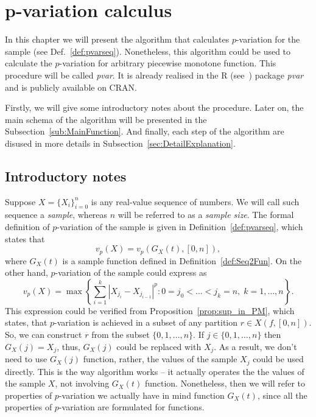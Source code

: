 \documentclass[12pt, a4paper]{article}
\numberwithin{equation}{section}
\begin{document}
\section{p-variation calculus}  
\label{sec:pvarcalc}  
  
In this chapter we will present the algorithm that calculates 
$p$-variation for the sample (see Def.~\ref{def:pvarseq}). 
Nonetheless, this algorithm could be used to calculate
the $p$-variation for arbitrary piecewise monotone function. 
This procedure will be called \emph{pvar}. 
It is already realised in the R (see~\cite{R}) package \emph{pvar} and
is publicly available on CRAN\footnotemark.

Firstly, we will give some introductory notes about the
procedure. Later on, the main schema of the
algorithm will be presented in the
Subsection~\ref{sub:MainFunction}. And finally, 
each step of the algorithm are disused in more details in 
Subsection~\ref{sec:DetailExplanation}.

\subsection{Introductory notes}


Suppose $X=\{X_{i}\}_{i=0}^{n}$ is any real-value sequence of numbers. 
We will call such sequence a \emph{sample}, 
whereas $n$ will be referred to as a \emph{sample size}.
The formal definition of $p$-variation 
of the sample is given in Definition~\ref{def:pvarseq}, 
which states that
\begin{equation}
  v_p(X) = v_p(G_X(t),[0,n]),
\end{equation}
where $G_X(t)$ is a sample function defined in  
Definition~\ref{def:Seq2Fun}.
On the other hand, 
$p$-variation of the sample could express as
\begin{equation}
  v_p(X) = \max\left\{ \sum_{i=1}^k |X_{j_i} - X_{j_{i-1}}|^p :
  0=j_0<\dots<j_k=n,\; k=1,\dots,n  \right\}.
\end{equation}
This expression could be verified from
Proposition~\ref{prop:sup_in_PM},
which states, that $p$-variation
is achieved in a subset of any partition $r \in X(f, [0,n])$.
So, we can construct $r$ from the subset $\{0, 1, \dots, n\}$. 
If $j \in \{0, 1, \dots, n\}$ then $G_X(j) = X_j$, thus,
$G_X(j)$ could be replaced with $X_j$. As a result,
we don't need to use $G_X(j)$ function, rather, 
the values of the sample $X_j$ could be used directly. 
This is the way algorithm works --
it actually operates the the values of the sample $X$,
not involving $G_X(t)$ function. Nonetheless,
then we will refer to properties of $p$-variation
we actually have in mind function $G_X(t)$, since all
the properties of $p$-variation are formulated for functions.
\end{document}
